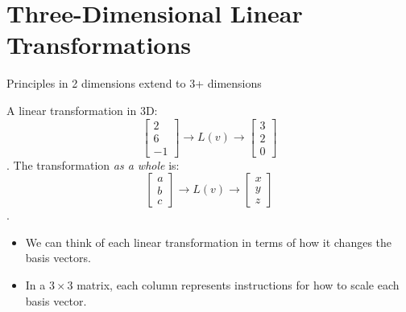 \section{Three-Dimensional Linear Transformations}
Principles in 2 dimensions extend to 3+ dimensions
\begin{example}
    A linear transformation in 3D:
    $$ \begin{bmatrix}
    2 \\
    6 \\
    -1
    \end{bmatrix} \rightarrow
    L(v) \rightarrow
    \begin{bmatrix}
    3 \\
    2 \\
    0
    \end{bmatrix}$$.
    The transformation \textit{as a whole} is:
    $$ \begin{bmatrix}
        a \\
        b \\
        c
    \end{bmatrix} \rightarrow
    L(v) \rightarrow
    \begin{bmatrix}
        x \\
        y \\
        z
    \end{bmatrix}$$.
\end{example}
\begin{itemize}
    \item We can think of each linear transformation in terms of how it changes the basis vectors.
    \item In a $3 \times 3$ matrix, each column represents instructions for how to scale each basis vector.
\end{itemize}